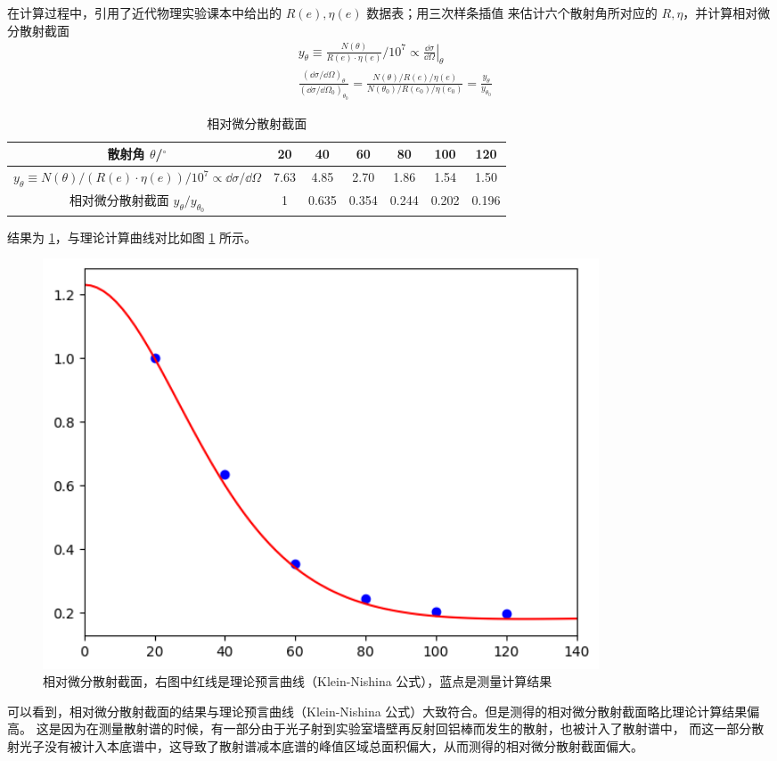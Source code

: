 \documentclass[revtex4-2]{mpltx}
\begin{document}
在计算过程中，引用了近代物理实验课本中给出的 $R(e),\eta(e)$ 数据表；用三次样条插值
来估计六个散射角所对应的 $R,\eta$，并计算相对微分散射截面
\begin{align*}
    &y_\theta \equiv \frac{N(\theta)}{R(e)\cdot\eta(e)} / 10^7 \propto \left.\frac{\dd \sigma}{\dd \Omega}\right|_{\theta}\\
    &\frac{(\dd\sigma/\dd\Omega)_\theta}{(\dd\sigma/\dd\Omega_0)_{\theta_0}}=\frac{N(\theta)/R(e)/\eta(e)}{N(\theta_0)/R(e_0)/\eta(e_0)}=\frac{y_\theta}{y_{\theta_0}}
\end{align*}
\begin{table}[htbp]
    \centering
    \caption{相对微分散射截面}
    \label{tab:4}
    \begin{tabular}{ccccccc}
        \hline
        散射角 $\theta$/${}^\circ$ & 20 & 40 & 60 & 80 & 100 & 120 \\
        \hline
        $y_\theta \equiv   N(\theta)/(R(e)\cdot\eta(e))/ 10^7\propto\dd\sigma/\dd\Omega $ &7.63 & 4.85 & 2.70 & 
        1.86 & 1.54 & 1.50\\
        相对微分散射截面 $y_\theta / y_{\theta_0}$ & 1 &  0.635 & 0.354 & 0.244 & 0.202 &
        0.196\\
        \hline
    \end{tabular}
\end{table}
结果为 \ref{tab:4}，与理论计算曲线对比如图 \ref{fig:6} 所示。
\begin{figure}[htbp]
    \centering
    \includegraphics[width=0.8\textwidth]{6.png}
    \caption{相对微分散射截面，右图中红线是理论预言曲线（Klein-Nishina 公式），蓝点是测量计算结果}
    \label{fig:6}
\end{figure}

可以看到，相对微分散射截面的结果与理论预言曲线（Klein-Nishina 公式）大致符合。但是测得的相对微分散射截面略比理论计算结果偏高。
这是因为在测量散射谱的时候，有一部分由于光子射到实验室墙壁再反射回铝棒而发生的散射，也被计入了散射谱中，
而这一部分散射光子没有被计入本底谱中，这导致了散射谱减本底谱的峰值区域总面积偏大，从而测得的相对微分散射截面偏大。
\end{document}
